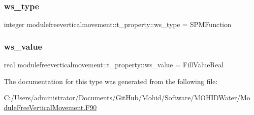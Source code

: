 \subsubsection{\texorpdfstring{ws\+\_\+type}{ws\_type}}
{\footnotesize\ttfamily integer modulefreeverticalmovement\+::t\+\_\+property\+::ws\+\_\+type = S\+P\+M\+Function\hspace{0.3cm}{\ttfamily [private]}}

\mbox{\label{structmodulefreeverticalmovement_1_1t__property_a0608e99eac44a341b656290e33686db3}} 
\subsubsection{\texorpdfstring{ws\+\_\+value}{ws\_value}}
{\footnotesize\ttfamily real modulefreeverticalmovement\+::t\+\_\+property\+::ws\+\_\+value = Fill\+Value\+Real\hspace{0.3cm}{\ttfamily [private]}}



The documentation for this type was generated from the following file\+:\begin{DoxyCompactItemize}
\item 
C\+:/\+Users/administrator/\+Documents/\+Git\+Hub/\+Mohid/\+Software/\+M\+O\+H\+I\+D\+Water/\mbox{\hyperlink{_module_free_vertical_movement_8_f90}{Module\+Free\+Vertical\+Movement.\+F90}}\end{DoxyCompactItemize}
